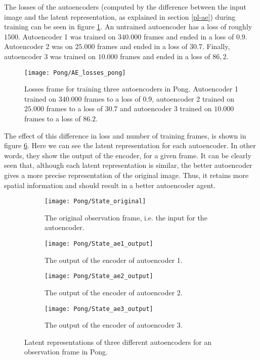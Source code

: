 The losses of the autoencoders (computed by the difference between the input image and the latent representation, as explained in section \ref{pl-ae}) during training can be seen in figure \ref{fig:ae-loss-pong}. An untrained autoencoder has a loss of roughly $1500$. Autoencoder 1 was trained on $340.000$ frames and ended in a loss of $0.9$. Autoencoder 2 was on $25.000$ frames and ended in a loss of $30.7$. Finally, autoencoder 3 was trained on $10.000$ frames and ended in a loss of $86,2$.

\begin{figure}[h!]
    \centering
   	\texttt{[image: Pong/AE\_losses\_pong]}
    	\caption{Losses frame for training three autoencoders in Pong. Autoencoder 1 trained on $340.000$ frames to a loss of $0.9$, autoencoder 2 trained on $25.000$ frames to a loss of $30.7$ and autoencoder 3 trained on $10.000$ frames to a loss of $86.2$.}
    	\label{fig:ae-loss-pong}
\end{figure}

The effect of this difference in loss and number of training frames, is shown in figure \ref{fig:ae-output-pong}. Here we can see the latent representation for each autoencoder. In other words, they show the output of the encoder, for a given frame. It can be clearly seen that, although each latent representation is similar, the better autoencoder gives a more precise representation of the original image. Thus, it retains more spatial information and should result in a better autoencoder agent.

\begin{figure}[h]
	\centering
	\begin{subfigure}[b]{0.5\textwidth}
		\texttt{[image: Pong/State\_original]}
		\caption{The original observation frame, i.e. the input for the autoencoder.}
		\label{fig:ae-state-original-pong} 
	\end{subfigure}
	\begin{subfigure}[b]{0.75\textwidth}
		\texttt{[image: Pong/State\_ae1\_output]}
		\caption{The output of the encoder of autoencoder 1.}
		\label{fig:ae1-state-pong}
	\end{subfigure}
	\begin{subfigure}[b]{0.5\textwidth}
		\texttt{[image: Pong/State\_ae2\_output]}
		\caption{The output of the encoder of autoencoder 2.}
		\label{fig:ae2-state-pong}
	\end{subfigure}
	\begin{subfigure}[b]{0.5\textwidth}
		\texttt{[image: Pong/State\_ae3\_output]}
		\caption{The output of the encoder of autoencoder 3.}
		\label{fig:ae3-state-pong}
	\end{subfigure}
	\caption{Latent representations of three different autoencoders for an observation frame in Pong.}
	\label{fig:ae-output-pong}
\end{figure}

